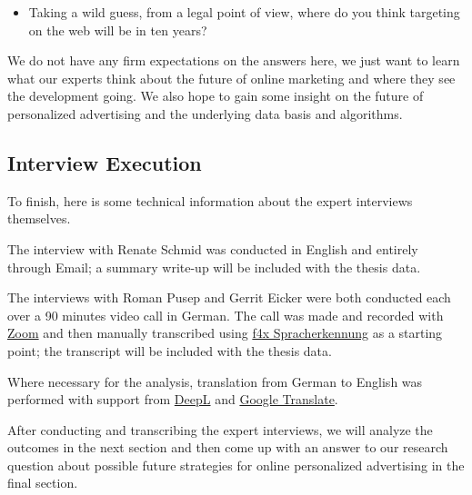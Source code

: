 \begin{itemize} 
 \item Taking a wild guess, from a legal point of view, where do you think targeting on the web will be in ten years?
\end{itemize}

We do not have any firm expectations on the answers here, we just want to learn what our experts think about the future of online marketing and where they see the development going. We also hope to gain some insight on the future of personalized advertising and the underlying data basis and algorithms.

\subsection{Interview Execution}

To finish, here is some technical information about the expert interviews themselves.

The interview with Renate Schmid was conducted in English and entirely through Email; a summary write-up will be included with the thesis data.

The interviews with Roman Pusep and Gerrit Eicker were both conducted each over a 90 minutes video call in German. The call was made and recorded with \href{https://zoom.us/}{Zoom} and then manually transcribed using \href{https://f4x.audiotranskription.de/}{f4x Spracherkennung} as a starting point; the transcript will be included with the thesis data.

Where necessary for the analysis, translation from German to English was performed with support from \href{https://www.deepl.com/en/translator}{DeepL} and \href{https://translate.google.de/}{Google Translate}.

After conducting and transcribing the expert interviews, we will analyze the outcomes in the next section and then come up with an answer to our research question about possible future strategies for online personalized advertising in the final section.
